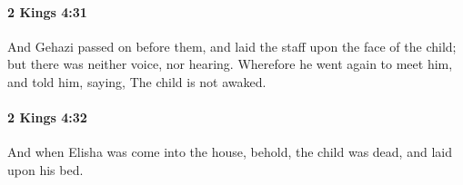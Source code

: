 		\paragraph{2 Kings 4:31} %
			\label{2KINGS-4-31}

			And Gehazi passed on before them, and laid the staff upon the face of the child; but there was neither voice, nor hearing. Wherefore he went again to meet him, and told him, saying, The child is not awaked.


		\paragraph{2 Kings 4:32} %
			\label{2KINGS-4-32}

			And when Elisha was come into the house, behold, the child was dead, and laid upon his bed.


